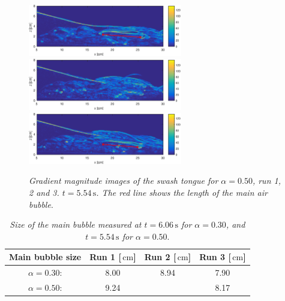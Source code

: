\documentclass[review, authoryear]{elsarticle}
\newcommand{\s}{\,\mbox{s}}
\newcommand{\cm}{\,\mbox{cm}}
\begin{document}
\begin{figure}[]
\centering
\includegraphics[angle=5.1,width=0.6\textwidth]{./Figures/BUBBLE/bubble50_run1_r.eps}
\includegraphics[angle=5.1,width=0.6\textwidth]{./Figures/BUBBLE/bubble50_run2_r.eps}
\includegraphics[angle=5.1,width=0.6\textwidth]{./Figures/BUBBLE/bubble50_run3_r.eps}
\caption{\textit{Gradient magnitude images of the swash tongue for $\alpha=0.50$, run 1, 2 and 3. $t=5.54\s$. The red line shows the length of the main air bubble}.}
\label{fig:bubble_50}
\end{figure} 


\begin{table}[]
\centering
\caption{\textit{ Size of the main bubble measured at $t=6.06\s$ for $\alpha=0.30$, and $t=5.54\s$ for $\alpha=0.50$}.}
\label{my-label}
\begin{tabular}{|c|c|c|c|}
\hline
\textbf{Main bubble size }              & \textbf{Run 1 {[}$\cm${]}} & \textbf{Run 2 {[}$\cm${]}} & \textbf{Run 3 {[}$\cm${]}} \\ \hline
$\alpha=0.30$:  & 8.00     & 8.94     & 7.90     \\ \hline
$\alpha=0.50$: & 9.24     &      & 8.17     \\ \hline
\end{tabular}
\label{tab:b_case30}
\end{table}
 
\end{document}
